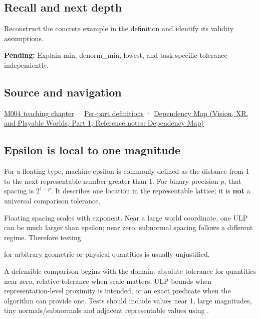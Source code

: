 \subsection{Recall and next depth}\label{appendix-390ea641da54-recall-and-next-depth}

\hypertarget{appendix-390ea641da54-recall-and-next-depth}{}

Reconstruct the concrete example in the definition and identify its validity assumptions.

\textbf{Pending:} Explain min, denorm\_min, lowest, and task-specific tolerance independently.

\subsection{Source and navigation}\label{appendix-390ea641da54-source-and-navigation}

\hypertarget{appendix-390ea641da54-source-and-navigation}{}

\hyperref[01-foundations-i-ch001-a-stretching-ruler-for-real-valued-quantities]{M004 teaching chapter} · \hyperref[appendix-fd090d982a15-m004---parts-61-76]{Per-part definitions} · \href{../07-Vision-XR-and-Playable-Worlds-P01/main.pdf\#nameddest=appendix-4ad47bdd269a}{Dependency Map (Vision, XR, and Playable Worlds, Part 1, Reference notes: Dependency Map)}

\subsection{Epsilon is local to one magnitude}\label{appendix-390ea641da54-epsilon-is-local-to-one-magnitude}

\hypertarget{appendix-390ea641da54-epsilon-is-local-to-one-magnitude}{}

For a floating type, machine epsilon is commonly defined as the distance from \(1\) to the next representable number greater than \(1\). For binary precision \(p\), that spacing is \(2^{1-p}\). It describes one location in the representable lattice; it is \textbf{not} a universal comparison tolerance.

Floating spacing scales with exponent. Near a large world coordinate, one ULP can be much larger than epsilon; near zero, subnormal spacing follows a different regime. Therefore testing


for arbitrary geometric or physical quantities is usually unjustified.

A defensible comparison begins with the domain: absolute tolerance for quantities near zero, relative tolerance when scale matters, ULP bounds when representation-level proximity is intended, or an exact predicate when the algorithm can provide one. Tests should include values near 1, large magnitudes, tiny normals/subnormals and adjacent representable values using .
